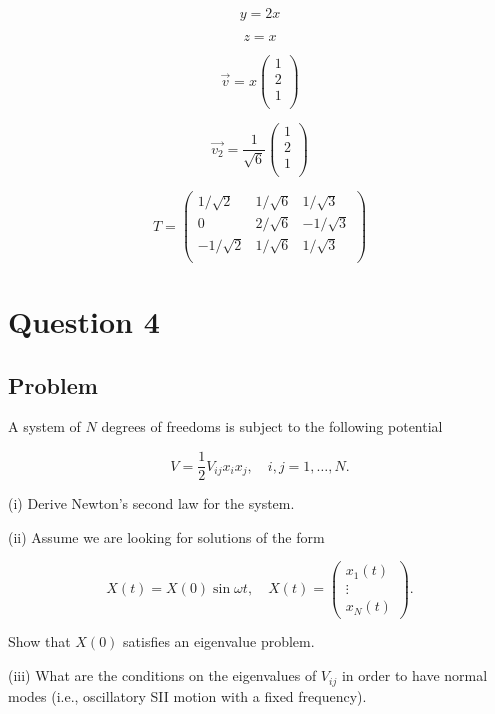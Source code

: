 \documentclass[12pt]{article}
\begin{document}
\[
    y = 2x
\]

\[
    z = x
\]

\[
    \vec{v} = x \begin{pmatrix}
        1 \\
        2 \\
        1 \\
    \end{pmatrix}
\]

\[
    \vec{v_2} = \frac{1}{\sqrt{6}} \begin{pmatrix}
        1 \\
        2 \\
        1 \\
    \end{pmatrix}
\]

\[
    T = \begin{pmatrix}
        1/\sqrt{2}  & 1/\sqrt{6} & 1/\sqrt{3}  \\
        0           & 2/\sqrt{6} & -1/\sqrt{3} \\
        -1/\sqrt{2} & 1/\sqrt{6} & 1/\sqrt{3}  \\
    \end{pmatrix}
\]

\newpage
\section{Question 4}

\subsection{Problem}

A system of \(N\) degrees of freedoms is subject to the following potential

\[
    V=\frac{1}{2} V_{i j} x_i x_j, \quad i, j=1, \ldots, N .
\]

(i) Derive Newton's second law for the system.

(ii) Assume we are looking for solutions of the form

\[
    X(t)=X(0) \sin \omega t, \quad X(t)=\left(\begin{array}{c}
            x_1(t) \\
            \vdots \\
            x_N(t)
        \end{array}\right) .
\]

Show that \(X(0)\) satisfies an eigenvalue problem.

(iii) What are the conditions on the eigenvalues of \(V_{i j}\) in order to have normal modes (i.e., oscillatory SII motion with a fixed frequency).
\end{document}
